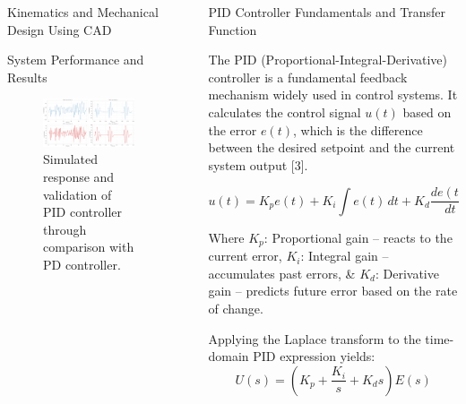 \documentclass[final]{beamer}
\newlength{\sepwidth}
\newlength{\colwidth}
\newcommand{\separatorcolumn}{\begin{column}{\sepwidth}\end{column}}
\begin{document}
\begin{frame}[t]
\begin{columns}[t]
\begin{column}{\colwidth}
\begin{block}{Kinematics and Mechanical Design Using CAD}
  \end{block}

  \begin{block}{System Performance and Results}
	  \begin{figure}
		\centering
		\includegraphics[width=01.0\textwidth]{logos/pid_pd_matrix_comparison_.png}
		\caption{Simulated response and validation of PID controller through comparison with PD controller.}
	  \end{figure}
  \end{block}

\end{column}

\separatorcolumn

\begin{column}{\colwidth}

  \begin{exampleblock}{PID Controller Fundamentals and Transfer Function}

	  The PID (Proportional-Integral-Derivative) controller is a fundamental feedback mechanism widely used in control systems. It calculates the control signal \( u(t) \) based on the error \( e(t) \), which is the difference between the desired setpoint and the current system output [3].

\[
u(t) = K_p e(t) + K_i \int e(t)\,dt + K_d \frac{de(t)}{dt}
\]

Where \( K_p \): Proportional gain – reacts to the current error, \( K_i \): Integral gain – accumulates past errors, \& \( K_d \): Derivative gain – predicts future error based on the rate of change.


Applying the Laplace transform to the time-domain PID expression yields:
\[
U(s) = \left(K_p + \frac{K_i}{s} + K_d s\right) E(s)
\]


\end{exampleblock}
\end{column}
\end{columns}
\end{frame}
\end{document}
